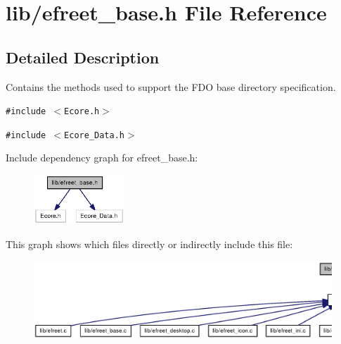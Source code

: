 \section{lib/efreet\_\-base.h File Reference}
\label{efreet__base_8h}


\subsection{Detailed Description}
Contains the methods used to support the FDO base directory specification. 



{\tt \#include $<$Ecore.h$>$}\par
{\tt \#include $<$Ecore\_\-Data.h$>$}\par


Include dependency graph for efreet\_\-base.h:\nopagebreak
\begin{figure}[H]
\begin{center}
\leavevmode
\includegraphics[width=97pt]{efreet__base_8h__incl}
\end{center}
\end{figure}


This graph shows which files directly or indirectly include this file:\nopagebreak
\begin{figure}[H]
\begin{center}
\leavevmode
\includegraphics[width=420pt]{efreet__base_8h__dep__incl}
\end{center}
\end{figure}
